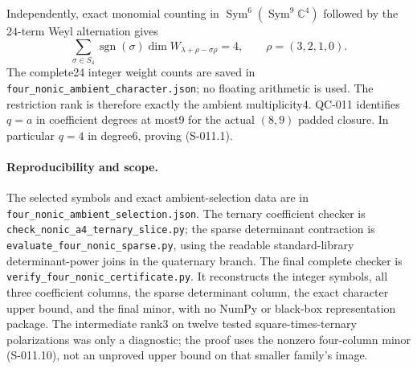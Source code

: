 Independently, exact monomial counting in
$\operatorname{Sym}^6(\operatorname{Sym}^9\mathbb C^4)$ followed by
the $24$-term Weyl alternation gives
\[
 \sum_{\sigma\in S_4}\operatorname{sgn}(\sigma)
   \dim W_{\lambda+\rho-\sigma\rho}=4,\qquad \rho=(3,2,1,0).
\]
The complete24 integer weight counts are saved in
\texttt{four\_nonic\_ambient\_character.json}; no floating arithmetic
is used. The restriction rank is therefore exactly the ambient
multiplicity4. QC-011 identifies $q=a$ in coefficient degrees at
most9 for the actual $(8,9)$ padded closure. In particular $q=4$
in degree6, proving (S-011.1).

\paragraph{Reproducibility and scope.}
The selected symbols and exact ambient-selection data are in
\texttt{four\_nonic\_ambient\_selection.json}.
The ternary coefficient checker is
\texttt{check\_nonic\_a4\_ternary\_slice.py};
the sparse determinant contraction is
\texttt{evaluate\_four\_nonic\_sparse.py}, using the readable
standard-library determinant-power joins in the quaternary branch.
The final complete checker is
\texttt{verify\_four\_nonic\_certificate.py}.
It reconstructs the integer symbols, all three coefficient columns,
the sparse determinant column, the exact character upper bound,
and the final minor, with no NumPy or black-box representation package.
The intermediate rank3 on twelve tested square-times-ternary
polarizations was only a diagnostic; the proof uses the nonzero
four-column minor (S-011.10), not an unproved upper bound on that
smaller family's image.
